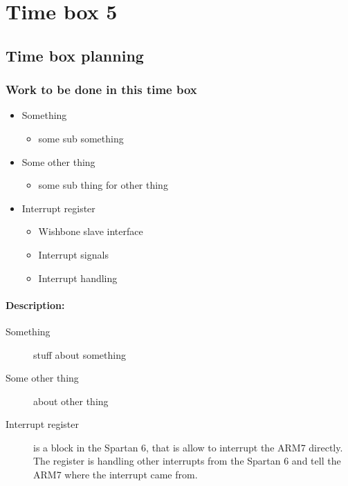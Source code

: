 \section{Time box 5}
\listoftodos
\subsection{Time box planning}
\begin{figure}[H]
	\begin{centering}
	\end{centering}
\end{figure}
\subsubsection{Work to be done in this time box}
\begin{itemize}
	\item Something
	\begin{itemize}
		\item some sub something
	\end{itemize}
	\item Some other thing
	\begin{itemize}
		\item some sub thing for other thing
	\end{itemize}
	\item Interrupt register
	\begin{itemize}
		\item Wishbone slave interface
		\item Interrupt signals
		\item Interrupt handling
	\end{itemize}
\end{itemize}
\paragraph{Description:}
\begin{description}
	\item[Something] stuff about something
	\item[Some other thing] about other thing
	\item[Interrupt register] is a block in the Spartan 6, that is allow to interrupt the ARM7 directly. The register is handling other interrupts from the Spartan 6 and tell the ARM7 where the interrupt came from.
\end{description}
